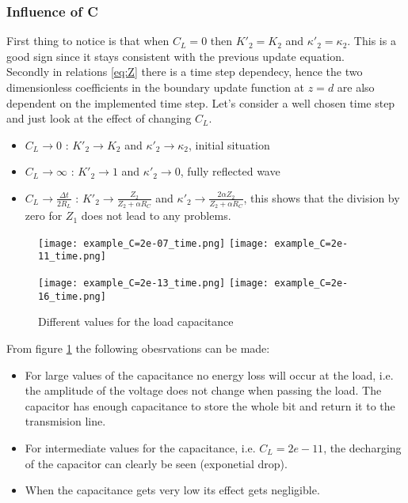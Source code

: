\subsubsection{Influence of C}

First thing to notice is that when $C_{L} = 0$ then $K'_{2} = K_{2}$ and $\kappa'_{2} = \kappa_{2}$. This is a good
sign since it stays consistent with the previous update equation.\\
Secondly in relations \ref{eq:Z} there is a time step dependecy, hence the two dimensionless
coefficients in the boundary update function at $z=d$ are also dependent on the implemented time step. Let's consider a
well chosen time step and just look at the effect of changing $C_{L}$.
\begin{itemize}
    \item $C_{L} \rightarrow 0$ :
        $K'_{2} \rightarrow K_{2}$ and $\kappa'_{2} \rightarrow \kappa_{2}$, initial situation
    \item $C_{L} \rightarrow \infty$ :
        $ K'_{2} \rightarrow 1$ and $\kappa'_{2} \rightarrow 0$, fully reflected wave
    \item $C_{L} \rightarrow \frac{\Delta t}{2R_{L}}$ :
        $K'_{2} \rightarrow \frac{Z_{2}}{Z_{2}+\alpha R_{C}}$ and $\kappa'_{2} \rightarrow \frac{2\alpha Z_{2}}{Z_{2}+\alpha R_{C}}$, this shows that the division by zero for $Z_1$ does not lead to any problems.
\end{itemize}

\begin{figure}[H]
    \texttt{[image: example\_C=2e-07\_time.png]}
    \texttt{[image: example\_C=2e-11\_time.png]}

    \texttt{[image: example\_C=2e-13\_time.png]}
    \texttt{[image: example\_C=2e-16\_time.png]}
    \caption{Different values for the load capacitance}
    \label{fig:effect_CL}
\end{figure}

From figure \ref*{fig:effect_CL} the following obesrvations can be made:
\begin{itemize}
    \item For large values of the capacitance no energy loss will occur at the load, i.e. the amplitude of the voltage does not change when passing the load. The capacitor has enough capacitance to store the whole bit and return it to the transmision line.
    \item For intermediate values for the capacitance, i.e. $C_L = 2e-11$, the decharging of the capacitor can clearly be seen (exponetial drop).
    \item When the capacitance gets very low its effect gets negligible.
\end{itemize}